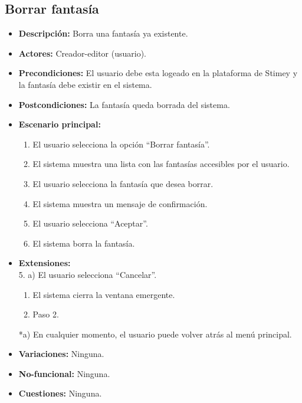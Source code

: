 \documentclass[12pt,letterpaper]{article}
\begin{document}
\subsection{Borrar fantasía}
\begin{itemize}
	\item \textbf{Descripción:} Borra una fantasía ya existente.
	\item \textbf{Actores:} Creador-editor (usuario).
	\item \textbf{Precondiciones:} El usuario debe esta logeado en la plataforma de Stimey y la fantasía debe existir en el sistema.
	\item \textbf{Postcondiciones:} La fantasía queda borrada del sistema.
	\item \textbf{Escenario principal:}
	\begin{enumerate}
		\item El usuario selecciona la opción ``Borrar fantasía''.
		\item El sistema muestra una lista con las fantasías accesibles por el usuario.
		\item El usuario selecciona la fantasía que desea borrar.
		\item El sistema muestra un mensaje de confirmación.
		\item El usuario selecciona ``Aceptar''.
		\item El sistema borra la fantasía.
	\end{enumerate}
	\item \textbf{Extensiones:}  \\5. a) El usuario selecciona ``Cancelar''.
	\begin{enumerate}
		\item El sistema cierra la ventana emergente.
		\item Paso 2.
	\end{enumerate}
	*a) En cualquier momento, el usuario puede volver atrás al menú principal.
	\item \textbf{Variaciones:} Ninguna.
	\item \textbf{No-funcional:} Ninguna.
	\item \textbf{Cuestiones:} Ninguna.
\end{itemize}
\end{document}
